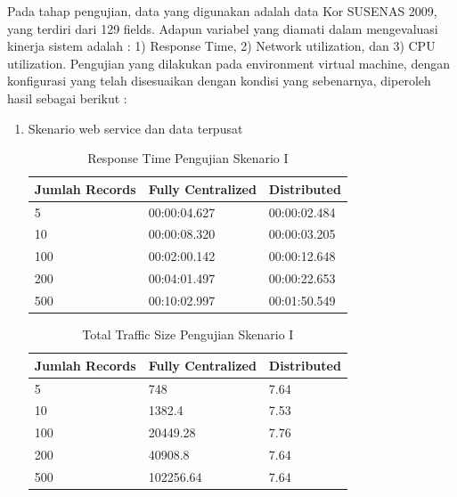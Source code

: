 Pada tahap pengujian, data yang digunakan adalah data Kor SUSENAS 2009, yang terdiri dari 129 fields. Adapun variabel yang diamati dalam mengevaluasi kinerja sistem adalah : 1) Response Time, 2) Network utilization, dan 3) CPU utilization. Pengujian yang dilakukan pada environment virtual machine, dengan konfigurasi yang telah disesuaikan dengan kondisi yang sebenarnya, diperoleh hasil sebagai berikut :
\begin{enumerate}
\item Skenario web service dan data terpusat

\begin{table}[H]
\begin{minipage}{\linewidth}
\centering
\begin{tabular}{|l|l|l|}
\hline
\textbf{Jumlah Records} & \textbf{Fully Centralized} & \textbf{Distributed} \\ \hline
5           & 00:00:04.627            & 00:00:02.484                  \\ \hline
10           & 00:00:08.320            & 00:00:03.205                  \\ \hline
100           & 00:02:00.142         & 00:00:12.648                  \\ \hline
200           & 00:04:01.497             & 00:00:22.653                 \\ \hline
500           & 00:10:02.997             & 00:01:50.549                 \\ \hline
\end{tabular}
\caption{Response Time Pengujian Skenario I}
\label{table:testing-1-response-time}
\end{minipage}
\end{table}

\begin{table}[H]
\begin{minipage}{\linewidth}
\centering
\begin{tabular}{|l|l|l|}
\hline
\textbf{Jumlah Records} & \textbf{Fully Centralized} & \textbf{Distributed} \\ \hline
5           & 748            & 7.64                  \\ \hline
10           & 1382.4            & 7.53                  \\ \hline
100           & 20449.28         & 7.76                  \\ \hline
200           & 40908.8             & 7.64                 \\ \hline
500           & 102256.64             & 7.64                 \\ \hline
\end{tabular}
\caption{Total Traffic Size Pengujian Skenario I}
\label{table:testing-1-traffic}
\end{minipage}
\end{table}


\end{enumerate}
